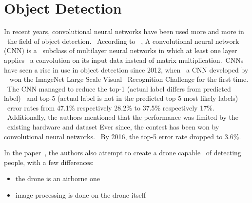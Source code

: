 \section{Object Detection}
\label{sec:research-object-detection}
In recent years, convolutional neural networks have been used more and more in \
the field of object detection. \
According to ~\cite{deepLearning}, A convolutional neural network (CNN) is a \
subclass of multilayer neural networks in which at least one layer applies \
a convolution on its input data instead of matrix multiplication.\
CNNs have seen a rise in use in object detection since 2012, when \
a CNN developed by ~\cite{imagenet} won the ImageNet Large Scale Visual \
Recognition Challenge for the first time. \
The CNN managed to reduce the top-1 (actual label differs from predicted label) \
 and top-5 (actual label is not in the predicted top 5 most likely labels) \
error rates from 47.1\% respectively 28.2\% to 37.5\% respectively 17\%. \
Additionally, the authors mentioned that the performance was limited by the \
existing hardware and dataset
Ever since, the contest has been won by convolutional neural networks. \
By 2016, the top-5 error rate dropped to 3.6\%.

%

In the paper~\cite{deepDrone}, the authors also attempt to create a drone capable \
of detecting people, with a few differences:
\begin{itemize}
    \item the drone is an airborne one
    \item image processing is done on the drone itself
\end{itemize}

